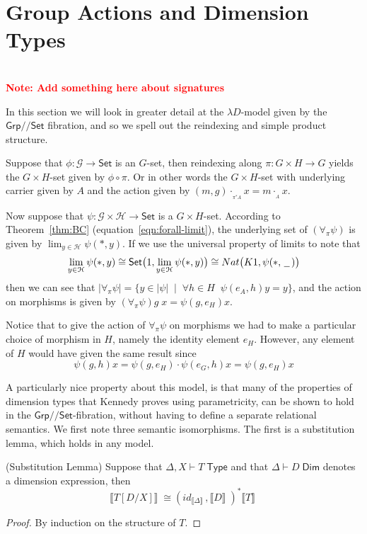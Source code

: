 \documentclass[a4paper,UKenglish]{lipics}
\newcommand\note[1]{{ \bf \textcolor{red} {\vspace{2mm}\; \\ Note: #1\\}}}
\newcommand{\msf}[1]{\mathsf{#1}} %
\newcommand{\Grp}{\msf{Grp}}
\newcommand{\Set}{\msf{Set}}
\newcommand{\blank}{\, \underline{\hspace{2mm}} \,}
\newcommand{\act}[1]{\cdot_{_{#1}}}
\newcommand{\Lslice}[1]{#1/\!/\Set}
\newcommand{\GrpSet}{\Lslice{\Grp}}
\newcommand{\bbracket}[1]{\bigl( #1 \bigr)}
\newcommand{\sem}[1]{\ensuremath{\llbracket #1 \rrbracket} \;}
\newcommand{\Dj}[2]{#1 \vdash #2 \; \msf{ Dim}}
\newcommand{\Dim}{D}
\begin{document}
\section{Group Actions and Dimension Types}\label{sec:MonSet}
\note{Add something here about signatures}

\noindent In this section we will look in greater detail at the $\lambda D$-model given by the $\GrpSet$ fibration, and so we spell out the reindexing and simple product structure.


Suppose that $\phi: \mathcal{G}\rightarrow \Set$ is an $G$-set, then reindexing along $\pi : G \times H \rightarrow G$ yields the $G \times H$-set given by $\phi \circ \pi$. Or in other words the $G \times H$-set with underlying carrier given by $A$ and the action given by $(m,g) \act{\pi^{\ast}A} x = m \act{A} x$.

Now suppose that $\psi : \mathcal{G} \times \mathcal{H} \rightarrow\Set $ is a $G \times H$-set. According to Theorem~\ref{thm:BC} (equation~\eqref{eqn:forall-limit}), the underlying set of $ (\forall _\pi \psi)$ is given by $\lim_{y\in \mathcal{H}} \psi (\ast, y)$. If we use the universal property of limits to note that
\[
 \lim_{y\in \mathcal{H}} \psi (\ast, y) \cong \Set \bbracket{1, \lim_{y\in \mathcal{H}} \psi (\ast, y)} \cong Nat \bbracket{K1, \psi (\ast, \blank)}
\]
then we can see that $|\forall_\pi \psi | = \{y \in |\psi| \; \; | \; \; \forall h\in H \; \; \psi(e_A, h) y = y \}$, and the action on morphisms is given by $(\forall_\pi \psi) g \; x = \psi (g, e_H) x$.

Notice that to give the action of $\forall_\pi \psi$ on morphisms we had to make a particular choice of morphism in $H$, namely the identity element $e_H$. However, any element of $H$ would have given the same result since
\[
  \psi (g, h) x = \psi (g, e_H) \cdot \psi (e_G, h) x = \psi (g, e_H) x
\]


A particularly nice property about this model, is that many of the properties of dimension types that Kennedy proves using parametricity, can be shown to hold in the $\GrpSet$-fibration, without having to define a separate relational semantics. We first note three semantic isomorphisms. The first is a substitution lemma, which holds in any model.

\begin{lemma}(Substitution Lemma)
\label{lem:subst}
Suppose that $\Delta, X \vdash T \; \msf{ Type}$ and that $\Dj\Delta \Dim$ denotes a dimension expression, then
\[
 \sem{T[D/X]} \cong (id_{\sem{\Delta}} , \sem{D})^\ast \sem{T}
\]
\end{lemma}
\begin{proof}
 By induction on the structure of $T$.
\end{proof}
\end{document}
